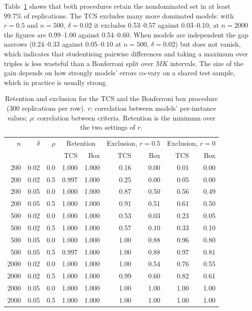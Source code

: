 \documentclass[pdflatex,sn-mathphys-num,iicol]{sn-jnl}
\theoremstyle{thmstyleone}
\theoremstyle{thmstyletwo}
\begin{document}
Table~\ref{tab:box} shows that both procedures retain the nondominated set in at least 99.7\% of replications. The TCS excludes many more dominated models: with $r=0.5$ and $n=500$, $\delta=0.02$ it excludes 0.53--0.57 against 0.03--0.10; at $n=2000$ the figures are 0.99--1.00 against 0.54--0.60. When models are independent the gap narrows (0.24--0.33 against 0.05--0.10 at $n=500$, $\delta=0.02$) but does not vanish, which indicates that studentising pairwise differences and taking a maximum over triples is less wasteful than a Bonferroni split over $MK$ intervals. The size of the gain depends on how strongly models' errors co-vary on a shared test sample, which in practice is usually strong.

\begin{table}[t]\centering\small
\caption{Retention and exclusion for the TCS and the Bonferroni box procedure (300 replications per row). $r$: correlation between models' per-instance values; $\rho$: correlation between criteria. Retention is the minimum over the two settings of $r$.}\label{tab:box}
\begin{tabular}{rrrrrrrrr}\toprule
$n$ & $\delta$ & $\rho$ & \multicolumn{2}{c}{Retention} & \multicolumn{2}{c}{Exclusion, $r=0.5$} & \multicolumn{2}{c}{Exclusion, $r=0$} \\
 & & & TCS & Box & TCS & Box & TCS & Box \\\midrule
200 & 0.02 & 0.0 & 1.000 & 1.000 & 0.16 & 0.00 & 0.01 & 0.00 \\
200 & 0.02 & 0.5 & 0.997 & 1.000 & 0.25 & 0.00 & 0.05 & 0.00 \\
200 & 0.05 & 0.0 & 1.000 & 1.000 & 0.87 & 0.50 & 0.56 & 0.49 \\
200 & 0.05 & 0.5 & 1.000 & 1.000 & 0.91 & 0.51 & 0.61 & 0.50 \\
500 & 0.02 & 0.0 & 1.000 & 1.000 & 0.53 & 0.03 & 0.23 & 0.05 \\
500 & 0.02 & 0.5 & 1.000 & 1.000 & 0.57 & 0.10 & 0.33 & 0.10 \\
500 & 0.05 & 0.0 & 1.000 & 1.000 & 1.00 & 0.88 & 0.96 & 0.80 \\
500 & 0.05 & 0.5 & 0.997 & 1.000 & 1.00 & 0.88 & 0.97 & 0.81 \\
2000 & 0.02 & 0.0 & 1.000 & 1.000 & 1.00 & 0.54 & 0.76 & 0.55 \\
2000 & 0.02 & 0.5 & 1.000 & 1.000 & 0.99 & 0.60 & 0.82 & 0.61 \\
2000 & 0.05 & 0.0 & 1.000 & 1.000 & 1.00 & 1.00 & 1.00 & 1.00 \\
2000 & 0.05 & 0.5 & 1.000 & 1.000 & 1.00 & 1.00 & 1.00 & 1.00 \\
\bottomrule\end{tabular}
\end{table}
\end{document}

